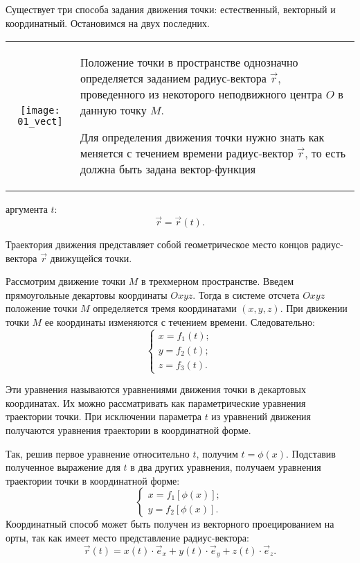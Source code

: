 
\vspace*{1em}
Существует три способа задания движения точки: естественный, векторный и
координатный. Остановимся на двух последних.

\begin{table}[h!]
    \begin{tabular}{C{.4}m{.55\textwidth}}
        \texttt{[image: 01\_vect]} &
        Положение точки в пространстве однозначно определяется заданием
        радиус-вектора \( \vec{r} \), проведенного из некоторого неподвижного
        центра \( O \) в данную точку \( M \).
        
        Для определения движения точки нужно знать как меняется с течением
        времени радиус-вектор \( \vec{r} \), то есть должна быть задана
        вектор-функция
    \end{tabular}
\end{table}

аргумента \( t \):
\[
    \vec{r} = \vec{r}(t).
\]

Траектория движения представляет собой геометрическое место концов
радиус-вектора \( \vec{r} \) движущейся точки.


Рассмотрим движение точки \( M \) в трехмерном пространстве. Введем
прямоугольные декартовы координаты \( Oxyz \). Тогда в системе отсчета
\( Oxyz \) положение точки \( M \) определяется тремя координатами
\( (x, y, z) \). При движении точки \( M \) ее координаты изменяются с течением
времени. Следовательно:
\[ \left\{ \begin{array}{l}
    x = f_1(t); \\
    y = f_2(t); \\
    z = f_3(t).
\end{array} \right. \]

Эти уравнения называются уравнениями движения точки в декартовых координатах. Их
можно рассматривать как параметрические уравнения траектории точки. При
исключении параметра \( t \) из уравнений движения получаются уравнения
траектории в координатной форме.

Так, решив первое уравнение относительно \( t \), получим \( t = \phi(x) \).
Подставив полученное выражение для \( t \) в два других уравнения, получаем
уравнения траектории точки в координатной форме:
\[ \left\{ \begin{array}{l}
    x = f_1[\phi(x)]; \\
    y = f_2[\phi(x)].
\end{array} \right. \]
Координатный способ может быть получен из векторного проецированием на орты, так
как имеет место представление радиус-вектора:
\[
    \vec{r}(t) = x(t)\cdot\vec{e}_x + y(t)\cdot\vec{e}_y + z(t)\cdot\vec{e}_z.
\]

